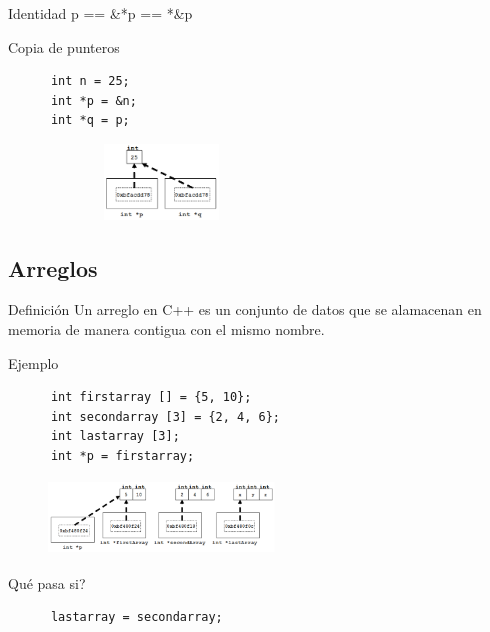 \documentclass[xcolor=table,spanish,9pt]{beamer}
\begin{document}
\begin{frame}[fragile]
  \begin{block}{Identidad}
    p == \&*p == *\&p
  \end{block}
  \begin{block}{Copia de punteros}
    \begin{lstlisting}
      int n = 25;
      int *p = &n;
      int *q = p;
    \end{lstlisting}
  \end{block}
  \begin{figure}
    \centering
    \includegraphics[width=6cm,height=2cm,keepaspectratio=true,clip=true]
    {./figures/copy_pointers.png}\\
  \end{figure}
\end{frame}


\subsection{Arreglos}

\begin{frame}[fragile]
  \begin{block}{Definición}
    Un arreglo en C++ es un conjunto de datos que se alamacenan en memoria de manera contigua con el mismo nombre.
  \end{block}
  \begin{block}{Ejemplo}
    \begin{lstlisting}
      int firstarray [] = {5, 10};
      int secondarray [3] = {2, 4, 6};
      int lastarray [3];
      int *p = firstarray;
    \end{lstlisting}
  \end{block}
  \begin{figure}
    \centering
    \includegraphics[width=6cm,height=2cm,keepaspectratio=true,clip=true]
    {./figures/arrays.png}\\
  \end{figure}
  \begin{alertblock}{Qué pasa si?}
    \begin{lstlisting}
      lastarray = secondarray;
    \end{lstlisting}
  \end{alertblock}
\end{frame}
\end{document}
